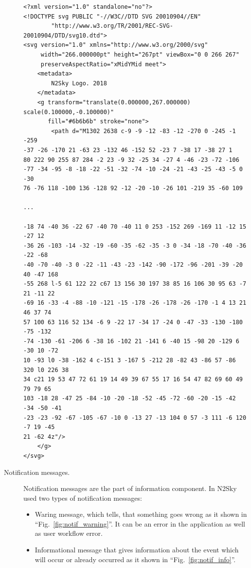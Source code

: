 \begin{description}
\begin{lstlisting}
<?xml version="1.0" standalone="no"?>
<!DOCTYPE svg PUBLIC "-//W3C//DTD SVG 20010904//EN"
        "http://www.w3.org/TR/2001/REC-SVG-20010904/DTD/svg10.dtd">
<svg version="1.0" xmlns="http://www.w3.org/2000/svg"
     width="266.000000pt" height="267pt" viewBox="0 0 266 267"
     preserveAspectRatio="xMidYMid meet">
    <metadata>
        N2Sky Logo. 2018
    </metadata>
    <g transform="translate(0.000000,267.000000) scale(0.100000,-0.100000)"
       fill="#6b6b6b" stroke="none">
        <path d="M1302 2638 c-9 -9 -12 -83 -12 -270 0 -245 -1 -259
-37 -26 -170 21 -63 23 -132 46 -152 52 -23 7 -38 17 -38 27 1
80 222 90 255 87 284 -2 23 -9 32 -25 34 -27 4 -46 -23 -72 -106 
-77 -34 -95 -8 -18 -22 -51 -32 -74 -10 -24 -21 -43 -25 -43 -5 0 -30 
76 -76 118 -100 136 -128 92 -12 -20 -10 -26 101 -219 35 -60 109 

...

-18 74 -40 36 -22 67 -40 70 -40 11 0 253 -152 269 -169 11 -12 15 -27 12 
-36 26 -103 -14 -32 -19 -60 -35 -62 -35 -3 0 -34 -18 -70 -40 -36 -22 -68
-40 -70 -40 -3 0 -22 -11 -43 -23 -142 -90 -172 -96 -201 -39 -20 40 -47 168
-55 268 l-5 61 122 22 c67 13 156 30 197 38 85 16 106 30 95 63 -7 21 -11 22
-69 16 -33 -4 -88 -10 -121 -15 -178 -26 -178 -26 -170 -1 4 13 21 46 37 74
57 100 63 116 52 134 -6 9 -22 17 -34 17 -24 0 -47 -33 -130 -180 -75 -132
-74 -130 -61 -206 6 -38 16 -102 21 -141 6 -40 15 -98 20 -129 6 -30 10 -72
10 -93 l0 -38 -162 4 c-151 3 -167 5 -212 28 -82 43 -86 57 -86 320 l0 226 38
34 c21 19 53 47 72 61 19 14 49 39 67 55 17 16 54 47 82 69 60 49 79 79 65
103 -18 28 -47 25 -84 -10 -20 -18 -52 -45 -72 -60 -20 -15 -42 -34 -50 -41
-23 -23 -92 -67 -105 -67 -10 0 -13 27 -13 104 0 57 -3 111 -6 120 -7 19 -45
21 -62 4z"/>
    </g>
</svg>
\end{lstlisting}

\item[Notification messages.] Notification messages are the part of information component. In N2Sky used two types of notification messages: 
\begin{itemize}
\item Waring message, which tells, that something goes wrong as it shown in ``Fig.~\ref{fig:notif_warning}''. It can be an error in the application as well as user workflow error. 
\item Informational message that gives information about the event which will occur or already occurred as it shown in ``Fig.~\ref{fig:notif_info}''.
\end{itemize}



\end{description}
